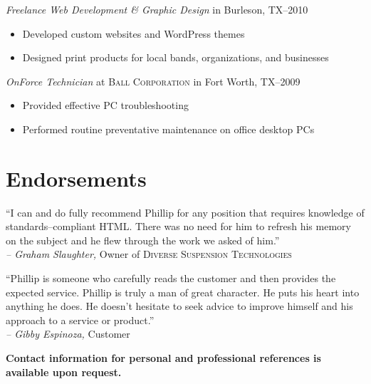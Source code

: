 \documentclass[margin]{res}
\begin{document}
\begin{resume}
                \textit{Freelance Web Development \textrm{\&} Graphic Design}
                in Burleson, TX--2010
                \begin{itemize} \itemsep -2pt %
                  \item Developed custom websites and WordPress themes
                  \item Designed print products for local bands, organizations, and businesses
                \end{itemize}
                
                \textit{OnForce Technician}
                at \textsc{Ball Corporation} in Fort Worth, TX--2009
                \begin{itemize} \itemsep -2pt %
                  \item Provided effective PC troubleshooting
                  \item Performed routine preventative maintenance on office desktop PCs
                \end{itemize}

      
\section{\textsf{Endorsements}}

                ``I can and do fully recommend Phillip for any position that requires 
                knowledge of standards--compliant HTML. There was no need for him to refresh his 
                memory on the subject and he flew through the work we asked of him.''             \\
                \textit{-- Graham Slaughter,} Owner of \textsc{Diverse Suspension Technologies}

                ``Phillip is someone who carefully reads the customer and then 
                provides the expected service. Phillip is truly a man of great character. 
                He puts his heart into anything he does. He doesn't hesitate to seek advice 
                to improve himself and his approach to a service or product.''                    \\
                \textit{-- Gibby Espinoza,} Customer
                
                \textsf{\textbf{\footnotesize Contact information for personal and professional references is available upon request.}}

%                 
                
\end{resume}
\end{document}
